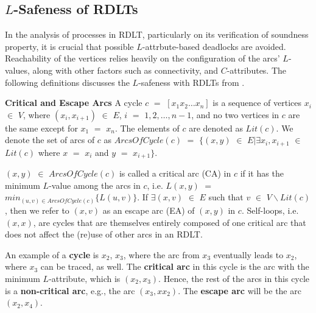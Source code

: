 \subsection*{$L$-Safeness of RDLTs}
In the analysis of processes in RDLT, particularly on its verification of soundness property, it is crucial that possible $L$-attrbute-based deadlocks are avoided. Reachability of the vertices relies heavily on the configuration of the arcs' $L$-values, along with other factors such as connectivity, and $C$-attributes. The following definitions discusses the $L$-safeness with RDLTs from \cite{MalinaoPJS2023}.
\begin{defn}\textbf{Critical and Escape Arcs} \cite{MalinaoPJS2023}
    A cycle $ c $ $ = $ $ [ x_1 x_2 \ldots x_n ] $ is a sequence of vertices $ x_i $ $ \in $ $ V $, where $ (x_i,x_{i+1}) $ $ \in $ $ E $, $ i $ $ = $ $ 1,2, \ldots, n - 1 $, and no two vertices in $ c $ are the same except for $ x_1 $ $ = $ $ x_n $. The elements of $ c $ are denoted as $ Lit(c) $. We denote the set of arcs of $ c $ as $ ArcsOfCycle(c) $ $ = $ $ \{ (x,y) $ $ \in $ $ E | \exists x_i, x_{i+1} $ $ \in $ $ Lit(c) $ where $ x $ $ =  $ $ x_i $ and $ y $ $ = $ $ x_{i+1} \} $.

    $ (x,y) $ $ \in $ $ ArcsOfCycle(c) $ is called a critical arc (CA) in $ c $ if it has the minimum $ L $-value among the arcs in $ c $, i.e. $ L(x,y) $ $ = $ $ min_{(u,v) \in ArcsOfCycle(c) } \{L(u,v)\} $. If $ \exists (x,v) $ $ \in $ $ E $ such that $ v $ $ \in $ $ V \backslash Lit(c) $, then we refer to $ (x,v) $ as an escape arc (EA) of $ (x,y) $ in $ c $. Self-loops, i.e. $ (x,x) $, are cycles that are themselves entirely composed of one critical arc that does not affect the (re)use of other arcs in an RDLT.
\end{defn}

An example of a \textbf{cycle} is $x_2$, $x_3$, where the arc from $x_3$ eventually leads to $x_2$, where $x_3$ can be traced, as well. The \textbf{critical arc} in this cycle is the arc with the minimum $L$-attribute, which is $(x_2, x_3)$. Hence, the rest of the arcs in this cycle is a \textbf{non-critical arc}, e.g., the arc $(x_3,xx_2)$. The \textbf{escape arc} will be the arc $(x_2,x_4)$.

